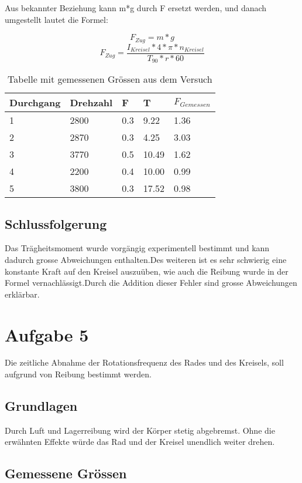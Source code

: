 \documentclass{article}
\begin{document}
Aus bekannter Beziehung kann m*g durch F ersetzt werden, und danach umgestellt lautet die Formel:

\begin{equation}
F_{Zug} = m*g
\end{equation}
\begin{equation}
F_{Zug}=\frac{I_{Kreisel}*4*\pi*n_{Kreisel}}{T_{90}*r*60}
\end{equation}
\begin{table}[H]
   \center
    \begin{tabular}{|l|l|l|l|l|}
        \hline
        Durchgang & Drehzahl & F   & T     & $F_{Gemessen}$    \\ \hline
        1         & 2800     & 0.3 & 9.22  & 1.36 \\ 
        2         & 2870     & 0.3 & 4.25  & 3.03 \\ 
        3         & 3770     & 0.5 & 10.49 & 1.62 \\ 
        4         & 2200     & 0.4 & 10.00 & 0.99 \\ 
        5         & 3800     & 0.3 & 17.52 & 0.98 \\
        \hline
    \end{tabular}
    \caption{Tabelle mit gemessenen Grössen aus dem Versuch}
\end{table}


\subsection{Schlussfolgerung}
Das Trägheitsmoment wurde vorgängig experimentell bestimmt und kann dadurch grosse Abweichungen enthalten.Des weiteren ist es sehr schwierig eine konstante Kraft auf den Kreisel auszuüben, wie auch die Reibung wurde in der Formel vernachlässigt.Durch die Addition dieser Fehler sind grosse Abweichungen erklärbar.
\newpage
\section{Aufgabe 5}
Die zeitliche Abnahme der Rotationsfrequenz des Rades und des Kreisels, soll aufgrund
von Reibung bestimmt werden.
\subsection{Grundlagen}
Durch Luft und Lagerreibung wird der Körper stetig abgebremst. Ohne die erwähnten Effekte würde das Rad und der Kreisel unendlich weiter drehen.
\subsection{Gemessene Grössen}
\end{document}
